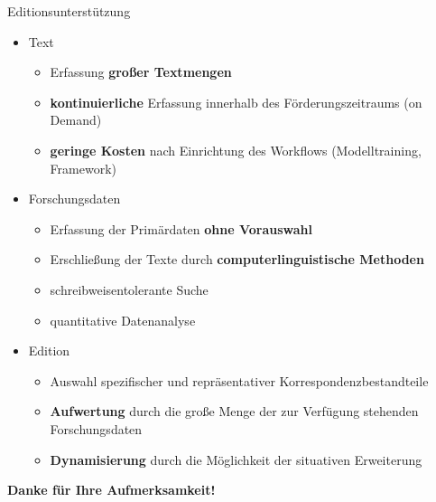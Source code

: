 \documentclass{bbawslides}
\begin{document}
\begin{bbawslide}{Editionsunterstützung}
  \vspace*{1mm}%
  \centerslidestrue%
  \begin{itemize}
    \item Text
    \begin{itemize}\small
      \item Erfassung \textbf{großer Textmengen}
      \item \textbf{kontinuierliche} Erfassung innerhalb des Förderungszeitraums (on Demand)
      \item \textbf{geringe Kosten} nach Einrichtung des Workflows (Modelltraining, Framework)
    \end{itemize}
    \item Forschungsdaten
    \begin{itemize}\small
      \item Erfassung der Primärdaten \textbf{ohne Vorauswahl}
      \item Erschließung der Texte durch \textbf{computerlinguistische Methoden} 
      \item schreibweisentolerante Suche
      \item quantitative Datenanalyse
    \end{itemize}
    \item Edition
    \begin{itemize}\small
      \item Auswahl spezifischer und repräsentativer Korrespondenzbestandteile
      \item \textbf{Aufwertung} durch die große Menge der zur Verfügung stehenden Forschungsdaten
      \item \textbf{Dynamisierung} durch die Möglichkeit der situativen Erweiterung 
    \end{itemize}
  \end{itemize}
\end{bbawslide}

\begin{bbawpart}{\Large\bf Danke für Ihre Aufmerksamkeit!\\}
\end{bbawpart}
\end{document}
